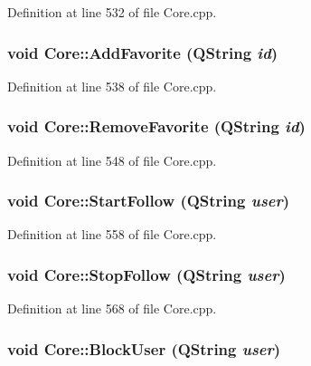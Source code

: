 Definition at line 532 of file Core.cpp.\hypertarget{classCore_dbeb18bcc46253950b7660582d2eb5f5}{
\subsubsection{\setlength{\rightskip}{0pt plus 5cm}void Core::AddFavorite (QString {\em id})}}
\label{classCore_dbeb18bcc46253950b7660582d2eb5f5}




Definition at line 538 of file Core.cpp.\hypertarget{classCore_c12e1d495cfea0a38c4adb38f258d27c}{
\subsubsection{\setlength{\rightskip}{0pt plus 5cm}void Core::RemoveFavorite (QString {\em id})}}
\label{classCore_c12e1d495cfea0a38c4adb38f258d27c}




Definition at line 548 of file Core.cpp.\hypertarget{classCore_5cd0ceaff4b8d19b40f9b2e00839a286}{
\subsubsection{\setlength{\rightskip}{0pt plus 5cm}void Core::StartFollow (QString {\em user})}}
\label{classCore_5cd0ceaff4b8d19b40f9b2e00839a286}




Definition at line 558 of file Core.cpp.\hypertarget{classCore_9a55db5cfe7788972b20d6a6bdc91218}{
\subsubsection{\setlength{\rightskip}{0pt plus 5cm}void Core::StopFollow (QString {\em user})}}
\label{classCore_9a55db5cfe7788972b20d6a6bdc91218}




Definition at line 568 of file Core.cpp.\hypertarget{classCore_e715888efd76cc27271e4050ebed4c0b}{
\subsubsection{\setlength{\rightskip}{0pt plus 5cm}void Core::BlockUser (QString {\em user})}}
\label{classCore_e715888efd76cc27271e4050ebed4c0b}




